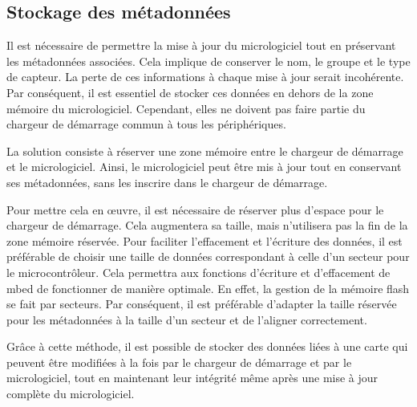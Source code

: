\subsection{Stockage des métadonnées}

Il est nécessaire de permettre la mise à jour du micrologiciel tout en préservant les métadonnées associées.
Cela implique de conserver le nom, le groupe et le type de capteur.
La perte de ces informations à chaque mise à jour serait incohérente.
Par conséquent, il est essentiel de stocker ces données en dehors de la zone mémoire du micrologiciel.
Cependant, elles ne doivent pas faire partie du chargeur de démarrage commun à tous les périphériques.

La solution consiste à réserver une zone mémoire entre le chargeur de démarrage et le micrologiciel.
Ainsi, le micrologiciel peut être mis à jour tout en conservant ses métadonnées, sans les inscrire dans le chargeur de démarrage.

Pour mettre cela en \oe{}uvre, il est nécessaire de réserver plus d'espace pour le chargeur de démarrage.
Cela augmentera sa taille, mais n'utilisera pas la fin de la zone mémoire réservée. Pour faciliter l'effacement et l'écriture des données, il est préférable de choisir une taille de données correspondant à celle d'un secteur pour le microcontrôleur.
Cela permettra aux fonctions d'écriture et d'effacement de mbed de fonctionner de manière optimale.
En effet, la gestion de la mémoire flash se fait par secteurs.
Par conséquent, il est préférable d'adapter la taille réservée pour les métadonnées à la taille d'un secteur et de l'aligner correctement.

Grâce à cette méthode, il est possible de stocker des données liées à une carte qui peuvent être modifiées à la fois par le chargeur de démarrage et par le micrologiciel, tout en maintenant leur intégrité même après une mise à jour complète du micrologiciel.

